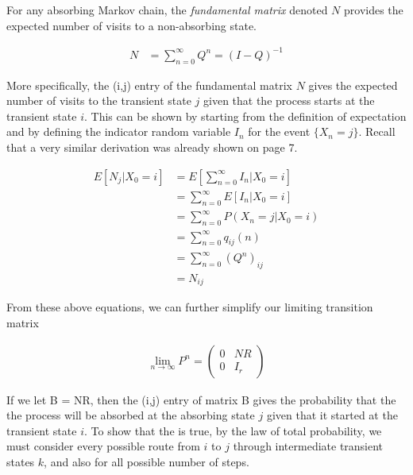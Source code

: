 \documentclass[a4paper,12pt]{article}
\theoremstyle{definition}
\begin{document}
	For any absorbing Markov chain, the \emph{fundamental matrix} denoted $N$ provides the expected number of visits to a non-absorbing 
	state. 

	\begin{equation*}
	\begin{aligned}
	 	N &= \sum_{n=0}^\infty Q^n = (I-Q)^{-1}
	\end{aligned}
	\end{equation*}	
	
	More specifically, the (i,j) entry of the fundamental matrix $N$ gives the expected number of visits to the transient state $j$ 
	given that the process starts at the transient state $i$. This can be shown by starting from the definition of expectation and 
	by defining the indicator random variable $I_n$ for the event $\{X_n = j\}$. Recall that a very similar derivation was already 
	shown on page 7.

	\begin{equation*}
	\begin{aligned}
		 E[N_j|X_0 = i] &= E\left[\sum_{n=0}^\infty I_n | X_0 = i\right] \\
		 				  &= \sum_{n=0}^\infty E\left[I_n | X_0 = i\right] \\
		 				  &= \sum_{n=0}^\infty P(X_n = j | X_0 = i) \\
		 				  &= \sum_{n=0}^\infty q_{ij}(n) \\
		 				  &= \sum_{n=0}^\infty (Q^n)_{ij} \\
		 				  &= N_{ij}
	\end{aligned}
	\end{equation*}

	From these above equations, we can further simplify our limiting transition matrix

	\begin{equation*}
		\begin{aligned}
			\lim_{n\to\infty}P^n = \left(
			\begin{array}{c|c}
			0 & NR \\
			\hline
			0 & I_r
			\end{array}
			\right)
		\end{aligned}
	\end{equation*}

	If we let B = NR, then the (i,j) entry of matrix B gives the probability that the the process will be absorbed at the absorbing 
	state $j$ given that it started at the transient state $i$. To show that the is true, by the law of total probability, we must 
	consider every possible route from $i$ to $j$ through intermediate transient states $k$, and also for all possible number of steps.
\end{document}
